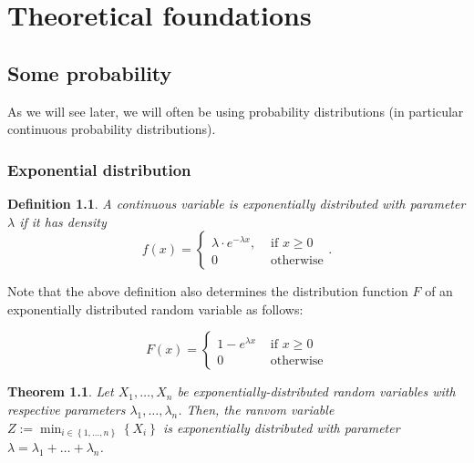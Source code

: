 \documentclass[letter]{report}
\newtheorem{definition}{Definition}[chapter]
\newtheorem{theorem}{Theorem}[chapter]
\begin{document}
\chapter{Theoretical foundations}
\label{chap:theoretical-foundations}

\section{Some probability}
\label{sec:some-probability}

As we will see later, we will often be using probability distributions (in particular continuous probability distributions).

\subsection{Exponential distribution}
\label{sec:exponential-distribution}

\begin{definition}
  A continuous variable is \emph{exponentially distributed} with parameter $\lambda$ if it has density 
  \begin{equation*}
    f(x) =
    \begin{cases}
      \lambda \cdot e^{-\lambda x}, & \text{ if } x \geq 0 
      \\ 0 & \text{ otherwise}
    \end{cases}
    .
  \end{equation*}
\end{definition}

Note that the above definition also determines the distribution function $F$ of an exponentially distributed random variable as follows:

\begin{equation*}
  F(x) =
  \begin{cases}
    1-e^{\lambda x} & \text{ if } x \geq 0 \\
    0 & \text{ otherwise}
  \end{cases}
\end{equation*}

\begin{theorem}
  Let $X_1,\dots,X_n$ be exponentially-distributed random variables with respective parameters $\lambda_1,\dots,\lambda_n$. Then, the ranvom variable $Z:=\min_{i\in\left\{ 1,\dots,n \right\}} \left\{ X_i \right\}$ is exponentially distributed with parameter $\lambda=\lambda_1+\dots+\lambda_n$.
\end{theorem}
\end{document}
